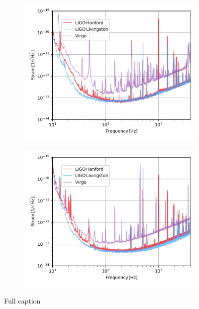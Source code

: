 \documentclass[11pt]{article}
\begin{document}
\begin{figure}[htb]
     \centering
     \begin{subfigure}[t]{0.47\linewidth}
         \centering
         \includegraphics[width=\linewidth]{shared_resources/shared_figs/o2_asd.png}
     \end{subfigure}
     \begin{subfigure}[t]{0.47\linewidth}
         \centering
         \includegraphics[width=\linewidth]{shared_resources/shared_figs/o3a_asd.png}
     \end{subfigure}
     \vspace*{-7mm}
     \caption{Full caption}
     \label{fig:asd}
\end{figure}
\end{document}
